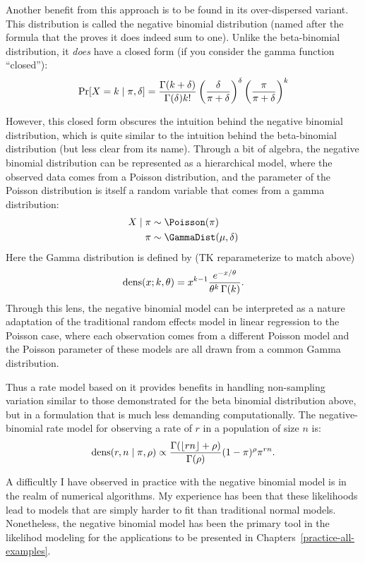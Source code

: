 Another benefit from this approach is to be found in its
over-dispersed variant.  This distribution
is called the negative binomial distribution (named after the formula
that the proves it does indeed sum to one).  Unlike the beta-binomial
distribution, it \emph{does} have a closed form (if you consider the gamma function ``closed''):
\[
\operatorname{Pr}[X = k\;|\; \pi, \delta] = \frac{\Gamma(k+\delta)}{\Gamma(\delta)k!}
\left(\frac{\delta}{\pi+\delta}\right)^\delta \left(\frac{\pi}{\pi+\delta}\right)^k
\]

However, this closed form obscures the intuition behind the negative
binomial distribution, which is quite similar to the intuition behind
the beta-binomial distribution (but less clear from its
name). Through a bit of algebra, the negative binomial distribution can
be represented as a hierarchical model, where the observed data comes
from a Poisson distribution, and the parameter of the Poisson
distribution is itself a random variable that comes from a gamma
distribution:
\begin{align*}
X\given \pi &\sim \Poisson(\pi)\\
\pi &\sim \GammaDist(\mu, \delta)
\end{align*}
Here the Gamma distribution is defined by (TK reparameterize to match above)
\[
\operatorname{dens}(x; k,\theta) =
x^{k-1} \frac{e^{-x/\theta}}{\theta^k \, \Gamma(k)}.
\]
Through this lens, the negative binomial model can be interpreted as a
nature adaptation of the traditional random effects model in linear
regression to the Poisson case, where each observation comes from a
different Poisson model and the Poisson parameter of these models are
all drawn from a common Gamma distribution.

Thus a rate model based on it provides benefits in handling
non-sampling variation similar to those demonstrated for the beta
binomial distribution above, but in a formulation that is much less
demanding computationally.  The negative-binomial rate model for
observing a rate of $r$ in a population of size $n$ is:
\[
\operatorname{dens}(r,n\;|\; \pi, \rho) \propto \frac{\Gamma(\lfloor rn\rfloor+\rho)}{\Gamma(\rho)} (1-\pi)^\rho \pi^{rn}.
\]

A difficultly I have observed in practice with the negative binomial
model is in the realm of numerical algorithms.  My experience has been that these
likelihoods lead to models that are simply harder to fit than
traditional normal models.  Nonetheless, the negative binomial model
has been the primary tool in the likelihod modeling for the
applications to be presented in Chapters~\ref{practice-all-examples}.

